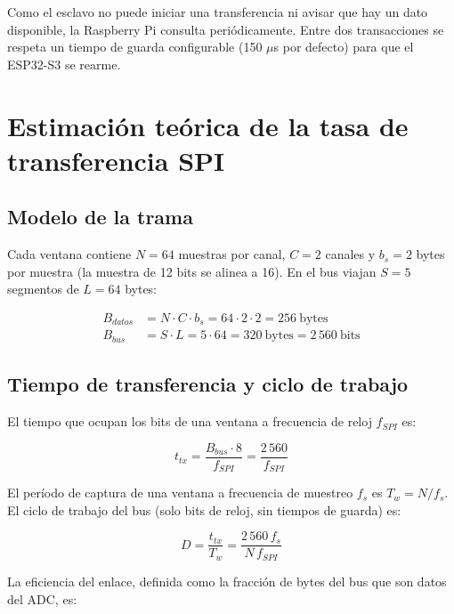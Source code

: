 \documentclass[12pt,a4paper]{article}
\begin{document}
Como el esclavo no puede iniciar una transferencia ni avisar que hay un dato disponible, la Raspberry Pi consulta periódicamente. Entre dos transacciones se respeta un tiempo de guarda configurable (150 $\mu$s por defecto) para que el ESP32-S3 se rearme.

\section{Estimación teórica de la tasa de transferencia SPI}

\subsection{Modelo de la trama}

Cada ventana contiene $N = 64$ muestras por canal, $C = 2$ canales y $b_s = 2$ bytes por muestra (la muestra de 12 bits se alinea a 16). En el bus viajan $S = 5$ segmentos de $L = 64$ bytes:

\begin{align}
B_{datos} &= N \cdot C \cdot b_s = 64 \cdot 2 \cdot 2 = 256 \ \text{bytes} \\
B_{bus} &= S \cdot L = 5 \cdot 64 = 320 \ \text{bytes} = 2\,560 \ \text{bits}
\end{align}

\subsection{Tiempo de transferencia y ciclo de trabajo}

El tiempo que ocupan los bits de una ventana a frecuencia de reloj $f_{SPI}$ es:

\begin{equation}
t_{tx} = \frac{B_{bus} \cdot 8}{f_{SPI}} = \frac{2\,560}{f_{SPI}}
\end{equation}

El período de captura de una ventana a frecuencia de muestreo $f_s$ es $T_w = N / f_s$. El ciclo de trabajo del bus (solo bits de reloj, sin tiempos de guarda) es:

\begin{equation}
D = \frac{t_{tx}}{T_w} = \frac{2\,560 \, f_s}{N \, f_{SPI}}
\end{equation}

La eficiencia del enlace, definida como la fracción de bytes del bus que son datos del ADC, es:
\end{document}

